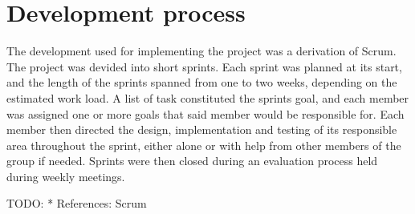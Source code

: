 \section{Development process}

The development used for implementing the project was a derivation of Scrum. The project
was devided into short sprints. Each sprint was planned at its start, and the length of
the sprints spanned from one to two weeks, depending on the estimated work load. A list
of task constituted the sprints goal, and each member was assigned one or more goals
that said member would be responsible for. Each member then directed the design,
implementation and testing of its responsible area throughout the sprint, either alone or
with help from other members of the group if needed. Sprints were then closed during an
evaluation process held during weekly meetings.

TODO:
* References: Scrum
